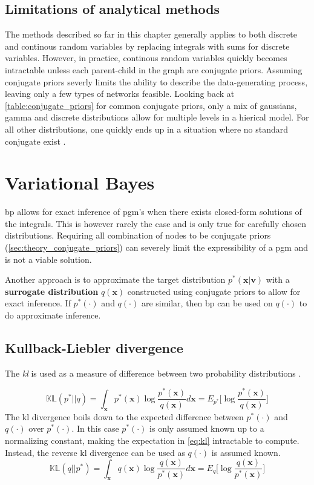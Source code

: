 \subsection{Limitations of analytical methods}
The methods described so far in this chapter generally applies to both discrete and continous random variables by replacing integrals with sums for discrete variables. However, in practice, continous random variables quickly becomes intractable unless each parent-child in the graph are conjugate priors. Assuming conjugate priors severly limits the ability to describe the data-generating process, leaving only a few types of networks feasible. Looking back at \cref{table:conjugate_priors} for common conjugate priors, only a mix of gaussians, gamma and discrete distributions allow for multiple levels in a hierical model. For all other distributions, one quickly ends up in a situation where no standard conjugate exist \cite{winnbishop}. 
\section{Variational Bayes}
\acrshort{bp} allows for exact inference of \acrshort{pgm}'s when there exists closed-form solutions of the integrals. This is however rarely the case and is only true for carefully chosen distributions. Requiring all combination of nodes to be conjugate priors (\cref{sec:theory_conjugate_priors}) can severely limit the expressibility of a \acrshort{pgm} and is not a viable solution. 

Another approach is to approximate the target distribution $p^*(\mathbf{x} | \mathbf{v})$ with a \textbf{surrogate distribution} $q(\mathbf{x})$ constructed using conjugate priors to allow for exact inference. If $p^*(\cdot)$ and $q(\cdot)$ are similar, then \acrshort{bp} can be used on $q(\cdot)$ to do approximate inference.

\subsection{Kullback-Liebler divergence}
The \textit{\acrfull{kl}}  is used as a measure of difference between two probability distributions \cite{kullback1951,murphy}.

\begin{equation}\label{eq:kl}
    \mathbb{KL}(p^* || q) = \int_\mathbf{x} p^*(\mathbf{x}) \log \frac{p^*(\mathbf{x})}{q(\mathbf{x})} d\mathbf{x} = E_{p^*} \big[ \log \frac{p^*(\mathbf{x})}{q(\mathbf{x})} \big]
\end{equation}
The \acrshort{kl} divergence boils down to the expected difference between $p^*(\cdot)$ and $q(\cdot)$ over $p^*(\cdot)$.
In this case $p^*(\cdot)$ is only assumed known up to a normalizing constant, making the expectation in \cref{eq:kl} intractable to compute. Instead, the reverse \acrshort{kl} divergence can be used as $q(\cdot)$ is assumed known.
\begin{equation}\label{eq:reverse_kl}
    \mathbb{KL}(q || p^*) = \int_\mathbf{x} q(\mathbf{x}) \log \frac{q(\mathbf{x})}{p^*(\mathbf{x})} d\mathbf{x} = E_{q} \big[ \log \frac{q(\mathbf{x})}{p^*(\mathbf{x})} \big]
\end{equation}

